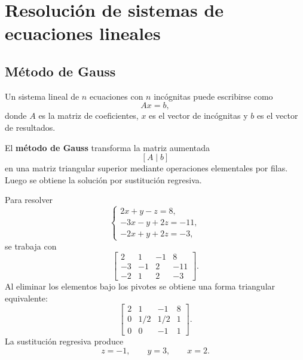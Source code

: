 \documentclass[a4,11pt]{aleph-notas}
\begin{document}
\section{Resolución de sistemas de ecuaciones lineales}

\subsection{Método de Gauss}

\begin{defi}
    Un sistema lineal de $n$ ecuaciones con $n$ incógnitas puede escribirse como
    \[
        A{x}={b},
    \]
    donde $A$ es la matriz de coeficientes, ${x}$ es el vector de incógnitas y ${b}$ es el vector de  resultados.
\end{defi}

\begin{defi}
    El \textbf{método de Gauss} transforma la matriz aumentada
    \[
        [A\mid {b}]
    \]
    en una matriz triangular superior mediante operaciones elementales por filas. Luego se obtiene la solución por sustitución regresiva.
\end{defi}

\begin{ejem}
    Para resolver
    \[
        \begin{cases}
            2x+y-z=8,\\
            -3x-y+2z=-11,\\
            -2x+y+2z=-3,
        \end{cases}
    \]
    se trabaja con
    \[
        \left[
        \begin{array}{ccc|c}
            2 & 1 & -1 & 8\\
            -3 & -1 & 2 & -11\\
            -2 & 1 & 2 & -3
        \end{array}
        \right].
    \]
    Al eliminar los elementos bajo los pivotes se obtiene una forma triangular equivalente:
    \[
        \left[
        \begin{array}{ccc|c}
            2 & 1 & -1 & 8\\
            0 & 1/2 & 1/2 & 1\\
            0 & 0 & -1 & 1
        \end{array}
        \right].
    \]
    La sustitución regresiva produce
    \[
        z=-1,\qquad y=3,\qquad x=2.
    \]
\end{ejem}
\end{document}
